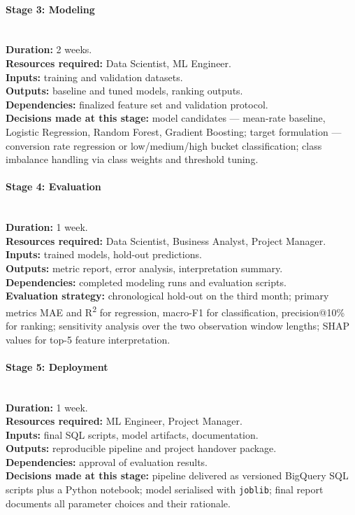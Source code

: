 \paragraph{Stage 3: Modeling}\mbox{}\\
\textbf{Duration:} 2 weeks.\\
\textbf{Resources required:} Data Scientist, ML Engineer.\\
\textbf{Inputs:} training and validation datasets.\\
\textbf{Outputs:} baseline and tuned models, ranking outputs.\\
\textbf{Dependencies:} finalized feature set and validation protocol.\\
\textbf{Decisions made at this stage:} model candidates --- mean-rate baseline, Logistic Regression, Random Forest, Gradient Boosting; target formulation --- conversion rate regression or low/medium/high bucket classification; class imbalance handling via class weights and threshold tuning.

\paragraph{Stage 4: Evaluation}\mbox{}\\
\textbf{Duration:} 1 week.\\
\textbf{Resources required:} Data Scientist, Business Analyst, Project Manager.\\
\textbf{Inputs:} trained models, hold-out predictions.\\
\textbf{Outputs:} metric report, error analysis, interpretation summary.\\
\textbf{Dependencies:} completed modeling runs and evaluation scripts.\\
\textbf{Evaluation strategy:} chronological hold-out on the third month; primary metrics MAE and R\textsuperscript{2} for regression, macro-F1 for classification, precision@10\% for ranking; sensitivity analysis over the two observation window lengths; SHAP values for top-5 feature interpretation.

\paragraph{Stage 5: Deployment}\mbox{}\\
\textbf{Duration:} 1 week.\\
\textbf{Resources required:} ML Engineer, Project Manager.\\
\textbf{Inputs:} final SQL scripts, model artifacts, documentation.\\
\textbf{Outputs:} reproducible pipeline and project handover package.\\
\textbf{Dependencies:} approval of evaluation results.\\
\textbf{Decisions made at this stage:} pipeline delivered as versioned BigQuery SQL scripts plus a Python notebook; model serialised with \texttt{joblib}; final report documents all parameter choices and their rationale.

